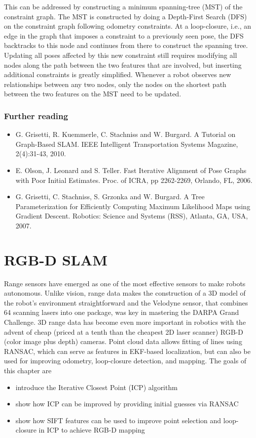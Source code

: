 \documentclass[paper=6.14in:9.21in,pagesize=pdftex,11pt,twoside,openright]{scrbook}
\begin{document}
This can be addressed by constructing a  minimum spanning-tree  (MST) of the constraint graph. The MST is constructed by doing a Depth-First Search (DFS) on the constraint graph following odometry constraints. At a loop-closure, i.e., an edge in the graph that imposes a constraint to a previously seen pose, the DFS backtracks to this node and continues from there to construct the spanning tree. Updating all poses affected by this new constraint still requires modifying all nodes along the path between the two features that are involved, but inserting additional constraints is greatly simplified. Whenever a robot observes new relationships between any two nodes, only the nodes on the shortest path between  the two features on the MST need to be updated. %
\subsection*{Further reading}
\begin{itemize}
\item G. Grisetti, R. Kuemmerle, C. Stachniss and W. Burgard. A Tutorial on Graph-Based SLAM. IEEE Intelligent Transportation Systems Magazine, 2(4):31-43, 2010.

\item E. Olson, J. Leonard and S. Teller. Fast Iterative Alignment of Pose Graphs with Poor Initial Estimates. Proc. of ICRA, pp 2262-2269, Orlando, FL, 2006.

\item G. Grisetti, C. Stachniss, S. Grzonka and W. Burgard. A Tree Parameterization for Efficiently Computing Maximum Likelihood Maps using Gradient Descent. Robotics: Science and Systems (RSS), Atlanta, GA, USA, 2007.
\end{itemize}

\chapter{RGB-D SLAM}
 Range sensors have emerged as one of the most effective sensors to make robots autonomous. Unlike vision, range data makes the construction of a 3D model of the robot's environment straightforward and the Velodyne sensor, that combines 64 scanning lasers into one package, was key in mastering the DARPA Grand Challenge.  3D range data has become even more important in robotics with the advent of cheap (priced at a tenth than the cheapest 2D laser scanner) RGB-D (color image plus depth) cameras. Point cloud data allows fitting of lines using RANSAC, which can serve as features in EKF-based localization, but can also be used for improving odometry, loop-closure detection, and mapping. The goals of this chapter are
\begin{itemize}
\item introduce the Iterative Closest Point (ICP) algorithm
\item show how ICP can be improved by providing initial guesses via RANSAC
\item show how SIFT features can be used to improve point selection and loop-closure in ICP to achieve RGB-D mapping
\end{itemize}
\end{document}

